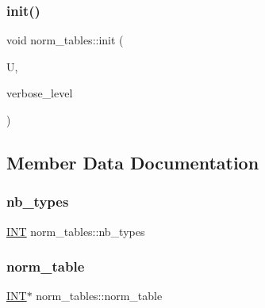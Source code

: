 \subsubsection{\texorpdfstring{init()}{init()}}
{\footnotesize\ttfamily void norm\+\_\+tables\+::init (\begin{DoxyParamCaption}\item[{\mbox{\hyperlink{classunusual__model}{unusual\+\_\+model}} \&}]{U,  }\item[{\mbox{\hyperlink{galois_8h_a09fddde158a3a20bd2dcadb609de11dc}{I\+NT}}}]{verbose\+\_\+level }\end{DoxyParamCaption})}



\subsection{Member Data Documentation}
\mbox{\label{classnorm__tables_aa31368c0198e66af3d6958d556171ee2}} 
\subsubsection{\texorpdfstring{nb\+\_\+types}{nb\_types}}
{\footnotesize\ttfamily \mbox{\hyperlink{galois_8h_a09fddde158a3a20bd2dcadb609de11dc}{I\+NT}} norm\+\_\+tables\+::nb\+\_\+types}

\mbox{\label{classnorm__tables_a405d3dc9cd3b6f74959f83e755bada45}} 
\subsubsection{\texorpdfstring{norm\+\_\+table}{norm\_table}}
{\footnotesize\ttfamily \mbox{\hyperlink{galois_8h_a09fddde158a3a20bd2dcadb609de11dc}{I\+NT}}$\ast$ norm\+\_\+tables\+::norm\+\_\+table}

\mbox{\label{classnorm__tables_acd708401d0a2a66ee1b4d1e3c62f807c}} 
